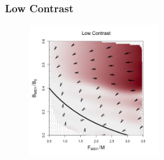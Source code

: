 \subsubsection{Low Contrast \label{schnuteLowResults}}

%
\begin{figure}
\vspace{-0.5cm}
\begin{minipage}[h!]{0.92\textwidth}
\includegraphics[width=0.5\textwidth]{../gpBias/directionalBiasSchnuteSubHHardFlatT30N150WWideN112.png}
\end{minipage}
\begin{minipage}[h!]{0.06\textwidth}
\vspace{-7cm}
\hspace*{6cm}

\end{minipage}
\end{figure}
